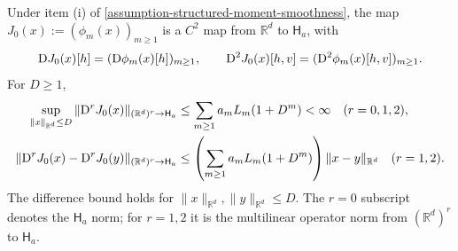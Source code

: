 \begin{lemma}
\label{lem:localized-weighted-feature-envelopes}
Under item (i) of \cref{assumption-structured-moment-smoothness}, the map
$J_0(x):=(\phi_m(x))_{m\ge1}$ is a $C^2$ map from $\mathbb R^d$ to
$\mathsf H_a$, with
\[
 \mathrm{D} J_0(x)[h]=(\mathrm{D}\phi_m(x)[h])_{m\ge1},\qquad
 \mathrm{D}^2J_0(x)[h,v]=(\mathrm{D}^2\phi_m(x)[h,v])_{m\ge1}.
\]
For $D\ge1$,
\begin{align}
 \sup_{\|x\|_{\mathbb R^d}\le D}\|\mathrm{D}^rJ_0(x)\|_{(\mathbb R^d)^r\to\mathsf H_a}
 &\le\sum_{m\ge1}a_mL_m(1+D^m)<\infty
       \quad(r=0,1,2),\label{eq:weighted-feature-derivative-bound}\\
 \|\mathrm{D}^rJ_0(x)-\mathrm{D}^rJ_0(y)\|_{(\mathbb R^d)^r\to\mathsf H_a}
 &\le\left(\sum_{m\ge1}a_mL_m(1+D^m)\right)\|x-y\|_{\mathbb R^d}
       \quad(r=1,2).
 \label{eq:weighted-feature-spatial-difference}
\end{align}
The difference bound holds for $\|x\|_{\mathbb R^d},\|y\|_{\mathbb R^d}\le D$.
The $r=0$ subscript denotes the $\mathsf H_a$ norm; for $r=1,2$ it is the
multilinear operator norm from $(\mathbb R^d)^r$ to $\mathsf H_a$.
\end{lemma}
